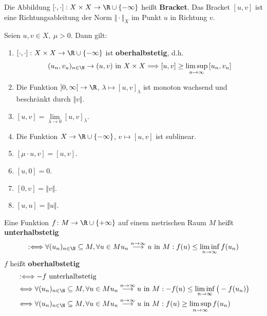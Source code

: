 Die Abbildung $[\cdot,\cdot]:X\times X\to\R\cup\lbrace-\infty\rbrace$ heißt \textbf{Bracket}. Das Bracket $[u,v]$ ist eine Richtungsableitung der Norm $\Vert\cdot\Vert_X$ im Punkt $u$ in Richtung $v$.

\begin{lemma}
Seien $u,v\in X,~\mu>0$. Dann gilt:
\begin{enumerate}[label=(\roman*)]
\item $\left[\cdot,\cdot\right]\colon X\times X\to\R\cup\lbrace-\infty\rbrace$ ist \textbf{oberhalbstetig}, d.h. 
\begin{align*}
(u_n,v_u)_{n\in\N}\to(u,v)\text{ in }X\times X\Longrightarrow\left[u,v\right]\geq\limsup_{n\to\infty}\left[u_n,v_n\right]
\end{align*}

	\item Die Funktion $\left]0,\infty\right[\to\R$, $\lambda\mapsto\left[u,v\right]_\lambda$ ist monoton wachsend und beschränkt durch $\Vert v\Vert$.
	\item $\left[u,v\right]=\lim\limits_{\lambda\to0}\left[u,v\right]_\lambda$.
	\item Die Funktion $X\to\R\cup\lbrace-\infty\rbrace$, $v\mapsto\left[u,v\right]$ ist sublinear.
	\item $\left[\mu\cdot u,v\right]=\left[u,v\right]$.
	\item $\left[u,0\right]=0$.
	\item $\left[0,v\right]=\Vert v\Vert$.
	\item $\left[u,u\right]=\Vert u\Vert$.
\end{enumerate}
\end{lemma}

\begin{definition}
Eine Funktion $f\colon M\to\R\cup\lbrace+\infty\rbrace$ auf einem metrischen Raum $M$ heißt \textbf{unterhalbstetig}
\begin{align*}
:\Longleftrightarrow
\forall(u_n)_{n\in\N}\subseteq M,\forall u\in M\mit
u_n\stackrel{n\to\infty}{\longrightarrow} u\text{ in }M:
f(u)\leq\liminf_{n\to\infty} f(u_n)
\end{align*}
$f$ heißt \textbf{oberhalbstetig}
\begin{align*}
&:\Longleftrightarrow -f\text{ unterhalbstetig}\\
&\Longleftrightarrow
\forall(u_n)_{n\in\N}\subseteq M,\forall u\in M\mit
u_n\stackrel{n\to\infty}{\longrightarrow} u\text{ in }M:
-f(u)\leq\liminf\limits_{n\to\infty}\big(-f(u_n)\big)\\
&\Longleftrightarrow
\forall(u_n)_{n\in\N}\subseteq M,\forall u\in M\mit
u_n\stackrel{n\to\infty}{\longrightarrow} u\text{ in }M:
f(u)\geq\limsup\limits_{n\to\infty} f(u_n)
\end{align*}
\end{definition}

